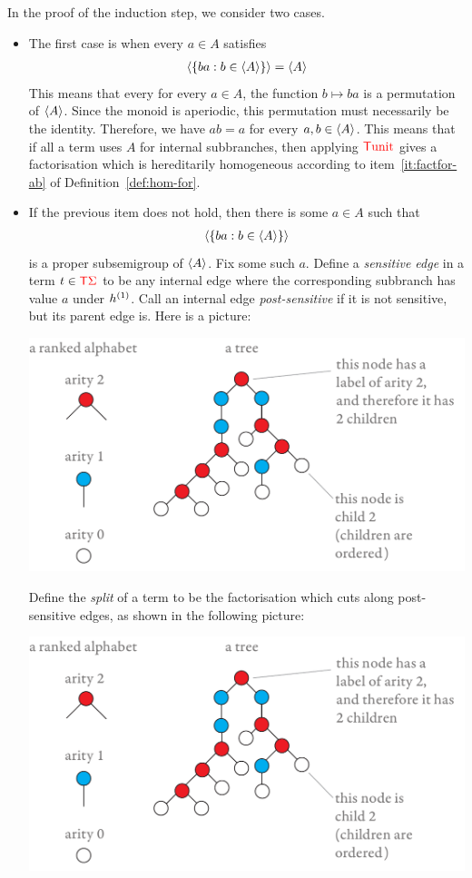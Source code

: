 In the proof of the induction step, we consider two cases.
\begin{itemize}
    \item The first case is  when  every $a \in A$ satisfies 
    \begin{align*}
       \subgen{\set{ b a :  b \in \subgen A}} = \subgen A
  \end{align*}
  This means that every for every $a \in A$, the function $b \mapsto ba$ is a permutation of $\subgen A$. Since the monoid is aperiodic, this permutation must necessarily be the identity.  Therefore, we have $ab=a$ for every $a,b \in \subgen A$. This means that if all a term uses $A$ for  internal subbranches, then applying $\tmonad \unit$  gives a factorisation which is hereditarily homogeneous according to item~\ref{it:factfor-ab} of Definition~\ref{def:hom-for}. 
    \item If the previous item does not hold, then there is some $a \in A$ such that 
    \begin{align*}
         \subgen{\set{ b a :  b \in \subgen A}}
    \end{align*}
    is a proper subsemigroup of $\subgen A$.  Fix some such $a$.  Define a \emph{sensitive edge} in a term  $t \in \tmonad \rSigma$ to be any internal edge where the corresponding subbranch has value $a$ under  $\hb 1 h$. Call an internal edge \emph{post-sensitive} if it is not sensitive, but its parent edge is. Here is a picture:
    \begin{center}
\includegraphics[scale=.27, page=8]{pics}
\end{center}
    Define the \emph{split} of a term to be the factorisation which  cuts along post-sensitive  edges, as shown in the following picture:
    \begin{center}
\includegraphics[scale=.29, page=88]{pics}

\end{center}
\end{itemize}
